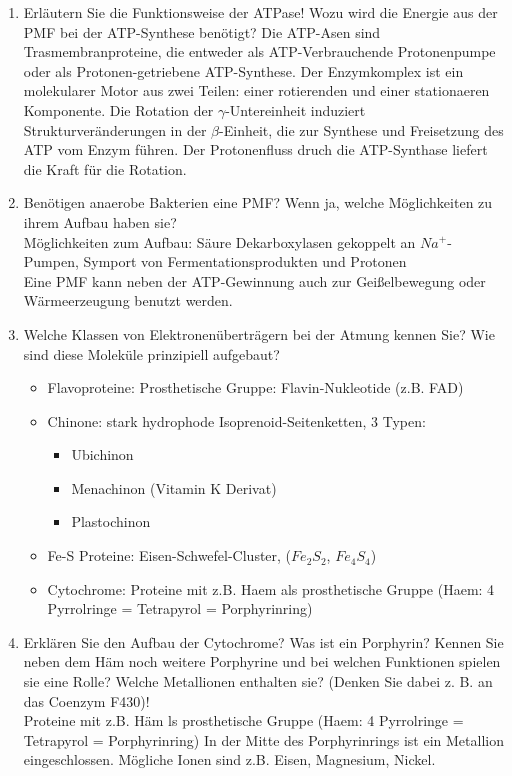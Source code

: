 \begin{enumerate}
	\item Erläutern Sie die Funktionsweise der  ATPase! Wozu wird die Energie aus der PMF bei der ATP-Synthese benötigt?
		Die ATP-Asen sind Trasmembranproteine, die entweder als ATP-Verbrauchende Protonenpumpe oder als Protonen-getriebene ATP-Synthese.
		Der Enzymkomplex ist ein molekularer Motor aus zwei Teilen: einer rotierenden und einer stationaeren Komponente. Die Rotation der $\gamma$-Untereinheit induziert Strukturver\"anderungen in der $\beta$-Einheit, die zur Synthese und Freisetzung des ATP vom Enzym f\"uhren. Der Protonenfluss druch die ATP-Synthase liefert die Kraft f\"ur die Rotation.
	\item Benötigen anaerobe Bakterien eine PMF? Wenn ja, welche Möglichkeiten zu ihrem Aufbau haben sie?	\\ 
		M\"oglichkeiten zum Aufbau: S\"aure Dekarboxylasen gekoppelt an $Na^+$-Pumpen, Symport von Fermentationsprodukten und Protonen \\
		Eine PMF kann neben der ATP-Gewinnung auch zur Geißelbewegung oder W\"armeerzeugung benutzt werden.
	\item Welche Klassen von Elektronenüberträgern bei der Atmung kennen Sie? Wie sind diese Moleküle prinzipiell aufgebaut?
		\begin{itemize} 
			\item Flavoproteine: Prosthetische Gruppe: Flavin-Nukleotide (z.B. FAD)
			\item Chinone: stark hydrophode Isoprenoid-Seitenketten, 3 Typen: 
				\begin{itemize} 
					\item Ubichinon
					\item Menachinon (Vitamin K Derivat)
					\item Plastochinon
				\end{itemize}

			\item Fe-S Proteine: Eisen-Schwefel-Cluster, ($Fe_2S_2$, $Fe_4S_4$) 
			\item Cytochrome: Proteine mit z.B.  Haem als prosthetische Gruppe (Haem: 4 Pyrrolringe = Tetrapyrol = Porphyrinring)

		\end{itemize}
	\item Erklären Sie  den Aufbau der Cytochrome? Was ist ein Porphyrin? Kennen Sie neben dem Häm noch weitere Porphyrine und bei  welchen Funktionen spielen sie eine Rolle? Welche Metallionen enthalten sie? (Denken Sie dabei z. B. an das  Coenzym F430)! \\
		Proteine mit z.B. H\"am ls prosthetische Gruppe (Haem: 4 Pyrrolringe = Tetrapyrol = Porphyrinring)
		In der Mitte des Porphyrinrings ist ein Metallion eingeschlossen. M\"ogliche Ionen sind z.B. Eisen, Magnesium, Nickel.
			


\end{enumerate}
